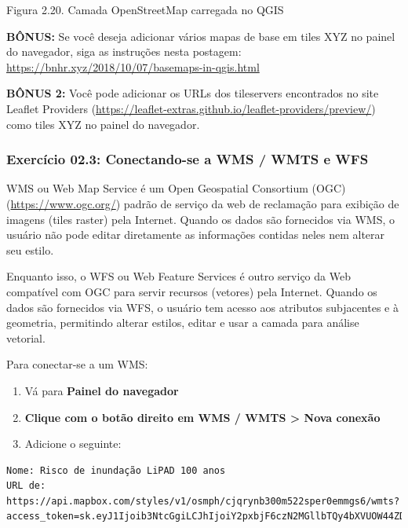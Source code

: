 \documentclass[
  portuguese,
]{krantz}
\providecommand{\tightlist}{%
  \setlength{\itemsep}{0pt}\setlength{\parskip}{0pt}}
\begin{document}
Figura 2.20. Camada OpenStreetMap carregada no QGIS

\textbf{BÔNUS:} Se você deseja adicionar vários mapas de base em tiles XYZ no painel do navegador, siga as instruções nesta postagem: \url{https://bnhr.xyz/2018/10/07/basemaps-in-qgis.html}

\textbf{BÔNUS 2:} Você pode adicionar os URLs dos tileservers encontrados no site Leaflet Providers (\href{https://leaflet-\%20extras.github.io/leaflet-providers/preview/}{https://leaflet-extras.github.io/leaflet-providers/preview/}) como tiles XYZ no painel do navegador.

\hypertarget{exercuxedcio-02.3-conectando-se-a-wms-wmts-e-wfs}{%
\subsubsection{\texorpdfstring{\textbf{Exercício 02.3: Conectando-se a WMS / WMTS e WFS}}{Exercício 02.3: Conectando-se a WMS / WMTS e WFS}}\label{exercuxedcio-02.3-conectando-se-a-wms-wmts-e-wfs}}

WMS ou Web Map Service é um Open Geospatial Consortium (OGC) (\href{https://www\%20.ogc.org\%20/}{https://www.ogc.org/}) padrão de serviço da web de reclamação para exibição de imagens (tiles raster) pela Internet. Quando os dados são fornecidos via WMS, o usuário não pode editar diretamente as informações contidas neles nem alterar seu estilo.

Enquanto isso, o WFS ou Web Feature Services é outro serviço da Web compatível com OGC para servir recursos (vetores) pela Internet. Quando os dados são fornecidos via WFS, o usuário tem acesso aos atributos subjacentes e à geometria, permitindo alterar estilos, editar e usar a camada para análise vetorial.

Para conectar-se a um WMS:

\begin{enumerate}
\def\labelenumi{\arabic{enumi}.}
\tightlist
\item
  Vá para \textbf{Painel do navegador}
\item
  \textbf{Clique com o botão direito em WMS / WMTS \textgreater{} Nova conexão}
\item
  Adicione o seguinte:
\end{enumerate}

\begin{verbatim}
Nome: Risco de inundação LiPAD 100 anos
URL de: https://api.mapbox.com/styles/v1/osmph/cjqrynb300m522sper0emmgs6/wmts?access_token=sk.eyJ1Ijoib3NtcGgiLCJhIjoiY2pxbjF6czN2MGllbTQy4bXVUOW44ZDlMS
\end{verbatim}
\end{document}
